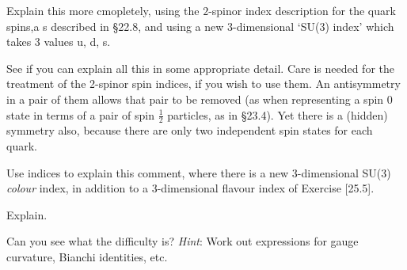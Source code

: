 \documentclass[../road-to-reality.tex]{subfiles}
\begin{document}
\begin{questions}
		\question Explain this more cmopletely, using the $2$-spinor index description for the quark spins,a s described in \S22.8, and using a new $3$-dimensional `SU(3) index' which takes 3 values u, d, s.
		
		\question See if you can explain all this in some appropriate detail. Care is needed for the treatment of the 2-spinor spin indices, if you wish to use them. An antisymmetry in a pair of them allows that pair to be removed (as when representing a spin 0 state in terms of a pair of spin $\frac{1}{2}$ particles, as in \S23.4). Yet there is a (hidden) symmetry also, because there are only two independent spin states for each quark.
		
		\question Use indices to explain this comment, where there is a new 3-dimensional SU(3) \textit{colour} index, in addition to a 3-dimensional flavour index of Exercise [25.5].
		
		\question Explain.
		
		\question Can you see what the difficulty is? \textit{Hint}: Work out expressions for gauge curvature, Bianchi identities, etc.
		
	\end{questions}
\end{document}
